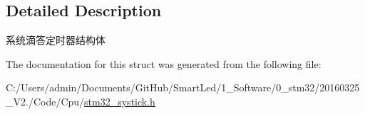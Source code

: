 \subsection{\-Detailed \-Description}
系统滴答定时器结构体 

\-The documentation for this struct was generated from the following file\-:\begin{DoxyCompactItemize}
\item 
\-C\-:/\-Users/admin/\-Documents/\-Git\-Hub/\-Smart\-Led/1\-\_\-\-Software/0\-\_\-stm32/20160325\-\_\-\-V2./\-Code/\-Cpu/\hyperlink{stm32__systick_8h}{stm32\-\_\-systick.\-h}\end{DoxyCompactItemize}
